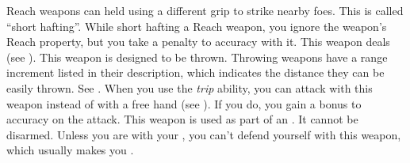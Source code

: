         Reach weapons can held using a different grip to strike nearby foes. This is called ``short hafting''. While short hafting a Reach weapon, you ignore the weapon's Reach property, but you take a  penalty to accuracy with it.
         This weapon deals  (see ).
         This weapon is designed to be thrown. Throwing weapons have a range increment listed in their description, which indicates the distance they can be easily thrown. See .
         When you use the \textit{trip} ability, you can attack with this weapon instead of with a free hand (see ).
        If you do, you gain a  bonus to accuracy on the attack.
         This weapon is used as part of an .
        It cannot be disarmed.
        Unless you are  with your , you can't defend yourself with this weapon, which usually makes you .

